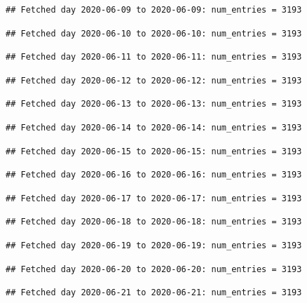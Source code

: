\documentclass[]{article}
\begin{document}
\begin{verbatim}
## Fetched day 2020-06-09 to 2020-06-09: num_entries = 3193
\end{verbatim}

\begin{verbatim}
## Fetched day 2020-06-10 to 2020-06-10: num_entries = 3193
\end{verbatim}

\begin{verbatim}
## Fetched day 2020-06-11 to 2020-06-11: num_entries = 3193
\end{verbatim}

\begin{verbatim}
## Fetched day 2020-06-12 to 2020-06-12: num_entries = 3193
\end{verbatim}

\begin{verbatim}
## Fetched day 2020-06-13 to 2020-06-13: num_entries = 3193
\end{verbatim}

\begin{verbatim}
## Fetched day 2020-06-14 to 2020-06-14: num_entries = 3193
\end{verbatim}

\begin{verbatim}
## Fetched day 2020-06-15 to 2020-06-15: num_entries = 3193
\end{verbatim}

\begin{verbatim}
## Fetched day 2020-06-16 to 2020-06-16: num_entries = 3193
\end{verbatim}

\begin{verbatim}
## Fetched day 2020-06-17 to 2020-06-17: num_entries = 3193
\end{verbatim}

\begin{verbatim}
## Fetched day 2020-06-18 to 2020-06-18: num_entries = 3193
\end{verbatim}

\begin{verbatim}
## Fetched day 2020-06-19 to 2020-06-19: num_entries = 3193
\end{verbatim}

\begin{verbatim}
## Fetched day 2020-06-20 to 2020-06-20: num_entries = 3193
\end{verbatim}

\begin{verbatim}
## Fetched day 2020-06-21 to 2020-06-21: num_entries = 3193
\end{verbatim}
\end{document}
